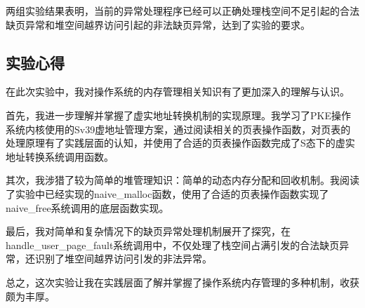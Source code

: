 两组实验结果表明，当前的异常处理程序已经可以正确处理栈空间不足引起的合法缺页异常和堆空间越界访问引起的非法缺页异常，达到了实验的要求。

\subsection{实验心得}
在此次实验中，我对操作系统的内存管理相关知识有了更加深入的理解与认识。

首先，我进一步理解并掌握了虚实地址转换机制的实现原理。我学习了PKE操作系统内核使用的Sv39虚地址管理方案，通过阅读相关的页表操作函数，对页表的处理原理有了实践层面的认知，并使用了合适的页表操作函数完成了S态下的虚实地址转换系统调用函数。

其次，我涉猎了较为简单的堆管理知识：简单的动态内存分配和回收机制。我阅读了实验中已经实现的naive_malloc函数，使用了合适的页表操作函数实现了naive_free系统调用的底层函数实现。

最后，我对简单和复杂情况下的缺页异常处理机制展开了探究，在handle_user_page_fault系统调用中，不仅处理了栈空间占满引发的合法缺页异常，还识别了堆空间越界访问引发的非法异常。

总之，这次实验让我在实践层面了解并掌握了操作系统内存管理的多种机制，收获颇为丰厚。
